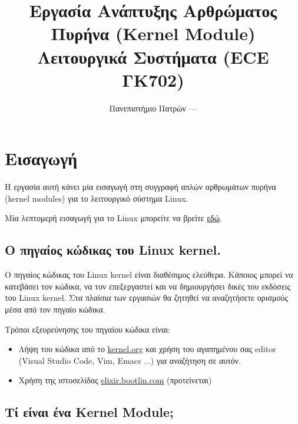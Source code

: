\documentclass[18pt]{extarticle}
\title{Εργασία Ανάπτυξης Αρθρώματος Πυρήνα (Kernel Module) \\Λειτουργικά Συστήματα (ECE ΓΚ702)} %
\date{Πανεπιστήμιο Πατρών --- \the\year{}} %
\begin{document}
\pagestyle{fancy}
\fancyhf{} %
\renewcommand{\headrulewidth}{0pt}
\fancyhead{} %
\fancyfoot{} %
\fancyfoot[R]{\thepage}

\maketitle


\section{Εισαγωγή}

Η εργασία αυτή κάνει μία εισαγωγή στη συγγραφή απλών αρθρωμάτων πυρήνα (kernel modules) 
για το λειτουργικό σύστημα Linux.

Μία λεπτομερή εισαγωγή για το Linux μπορείτε να βρείτε \href{https://linux-kernel-labs.github.io/refs/heads/master/lectures/intro.html}{εδώ}.

\subsection{Ο πηγαίος κώδικας του Linux kernel.}

Ο πηγαίος κώδικας του Linux kernel είναι διαθέσιμος ελεύθερα. 
Κάποιος μπορεί να κατεβάσει τον κώδικα, να τον επεξεργαστεί και να δημιουργήσει δικές του εκδόσεις του Linux kernel.
Στα πλαίσια των εργασιών θα ζητηθεί να αναζητήσετε ορισμούς μέσα από τον πηγαίο κώδικα.

Τρόποι εξευρεύνησης του πηγαίου κώδικα είναι:

\begin{itemize}
    \item Λήψη του κώδικα από το \href{https://kernel.org/}{kernel.org} και χρήση του αγαπημένου σας editor (Visual Studio Code, Vim, Emacs ...) για αναζήτηση σε αυτόν.
    \item Χρήση της ιστοσελίδας \href{https://elixir.bootlin.com/linux/latest/source}{elixir.bootlin.com} (προτείνεται)
\end{itemize}

\subsection{Τί είναι ένα Kernel Module;}
\end{document}
